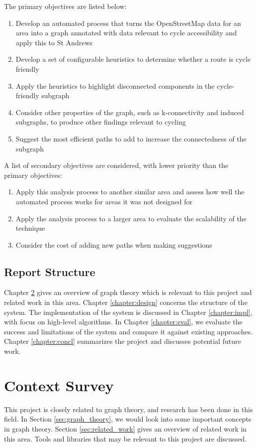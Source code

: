 \documentclass[12pt,a4paper]{report}
\begin{document}
The primary objectives are listed below:
\begin{enumerate}
    \item Develop an automated process that turns the OpenStreetMap data for an area into a graph annotated with data relevant to cycle accessibility and apply this to St Andrews
    \item Develop a set of configurable heuristics to determine whether a route is cycle friendly
    \item Apply the heuristics to highlight disconnected components in the cycle-friendly subgraph
    \item Consider other properties of the graph, such as k-connectivity and induced subgraphs, to produce other findings relevant to cycling
    \item Suggest the most efficient paths to add to increase the connectedness of the subgraph
\end{enumerate}

A list of secondary objectives are considered, with lower priority than the primary objectives:
\begin{enumerate}
    \item Apply this analysis process to another similar area and assess how well the automated process works for areas it was not designed for
    \item Apply the analysis process to a larger area to evaluate the scalability of the technique
    \item Consider the cost of adding new paths when making suggestions
\end{enumerate}

\section{Report Structure}
Chapter \ref{chapter:context} gives an overview of graph theory which is relevant to this project and related work in this area. Chapter \ref{chapter:design} concerns the structure of the system. The implementation of the system is discussed in Chapter \ref{chapter:impl}, with focus on high-level algorithms. In Chapter \ref{chapter:eval}, we evaluate the success and limitations of the system and compare it against existing approaches. Chapter \ref{chapter:concl} summarizes the project and discusses potential future work.

\chapter{Context Survey}\label{chapter:context}
This project is closely related to graph theory, and research has been done in this field. In Section \ref{sec:graph_theory}, we would look into some important concepts in graph theory. Section \ref{sec:related_work} gives an overview of related work in this area. Tools and libraries that may be relevant to this project are discussed.
\end{document}
